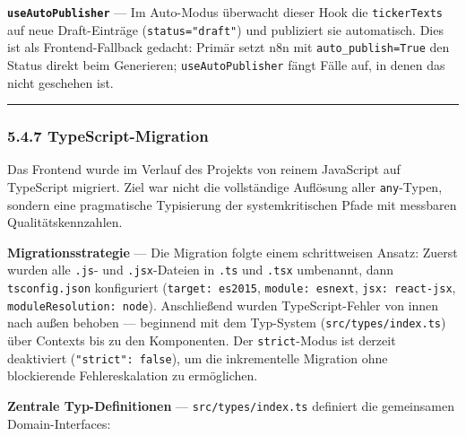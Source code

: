 \textbf{\texttt{useAutoPublisher}} --- Im Auto-Modus überwacht dieser
Hook die \texttt{tickerTexts} auf neue Draft-Einträge
(\texttt{status="draft"}) und publiziert sie automatisch. Dies ist als
Frontend-Fallback gedacht: Primär setzt n8n mit
\texttt{auto\_publish=True} den Status direkt beim Generieren;
\texttt{useAutoPublisher} fängt Fälle auf, in denen das nicht geschehen
ist.

\begin{center}\rule{0.5\linewidth}{0.5pt}\end{center}

\subsubsection{5.4.7 TypeScript-Migration}\label{typescript-migration}

Das Frontend wurde im Verlauf des Projekts von reinem JavaScript auf
TypeScript migriert. Ziel war nicht die vollständige Auflösung aller
\texttt{any}-Typen, sondern eine pragmatische Typisierung der
systemkritischen Pfade mit messbaren Qualitätskennzahlen.

\textbf{Migrationsstrategie} --- Die Migration folgte einem
schrittweisen Ansatz: Zuerst wurden alle \texttt{.js}- und
\texttt{.jsx}-Dateien in \texttt{.ts} und \texttt{.tsx} umbenannt, dann
\texttt{tsconfig.json} konfiguriert (\texttt{target:\ es2015},
\texttt{module:\ esnext}, \texttt{jsx:\ react-jsx},
\texttt{moduleResolution:\ node}). Anschließend wurden TypeScript-Fehler
von innen nach außen behoben --- beginnend mit dem Typ-System
(\texttt{src/types/index.ts}) über Contexts bis zu den Komponenten. Der
\texttt{strict}-Modus ist derzeit deaktiviert
(\texttt{"strict":\ false}), um die inkrementelle Migration ohne
blockierende Fehlereskalation zu ermöglichen.

\textbf{Zentrale Typ-Definitionen} --- \texttt{src/types/index.ts}
definiert die gemeinsamen Domain-Interfaces:

